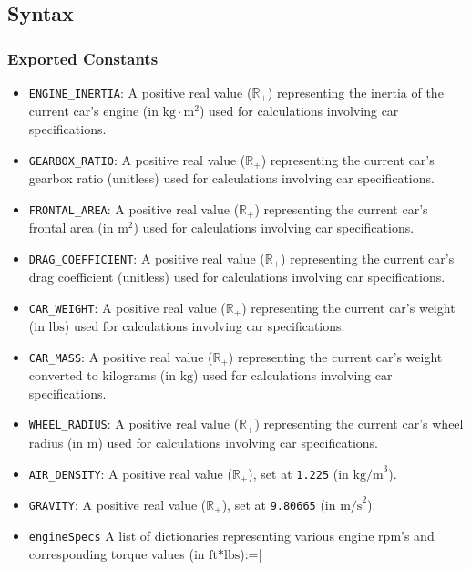 \documentclass[12pt, titlepage]{article}
\begin{document}
\subsection{Syntax}

\subsubsection{Exported Constants}

\begin{itemize}
  \item \texttt{ENGINE\_INERTIA}: A positive real value ($\mathbb{R}_{+}$) representing the inertia of the current car's engine (in $\text{kg}\cdot\text{m}^2$) used for calculations involving car specifications.
  \item \texttt{GEARBOX\_RATIO}: A positive real value ($\mathbb{R}_{+}$) representing the current car's gearbox ratio (unitless) used for calculations involving car specifications.
  \item \texttt{FRONTAL\_AREA}: A positive real value ($\mathbb{R}_{+}$) representing the current car's frontal area (in $\text{m}^2$) used for calculations involving car specifications.
  \item \texttt{DRAG\_COEFFICIENT}: A positive real value ($\mathbb{R}_{+}$) representing the current car's drag coefficient (unitless) used for calculations involving car specifications.
  \item \texttt{CAR\_WEIGHT}: A positive real value ($\mathbb{R}_{+}$) representing the current car's weight (in $\text{lbs}$) used for calculations involving car specifications.
  \item \texttt{CAR\_MASS}: A positive real value ($\mathbb{R}_{+}$) representing the current car's weight converted to kilograms (in $\text{kg}$) used for calculations involving car specifications.
  \item \texttt{WHEEL\_RADIUS}: A positive real value ($\mathbb{R}_{+}$) representing the current car's wheel radius (in $\text{m}$) used for calculations involving car specifications.
  \item \texttt{AIR\_DENSITY}: A positive real value ($\mathbb{R}_{+}$), set at \texttt{1.225} (in $\text{kg/m}^3$).
  \item \texttt{GRAVITY}: A positive real value ($\mathbb{R}_{+}$), set at \texttt{9.80665} (in $\text{m/s}^2$).
  \item \texttt{engineSpecs} A list of dictionaries representing various engine rpm's and corresponding torque values (in $\text{ft*lbs}$):=[

\end{itemize}
\end{document}
